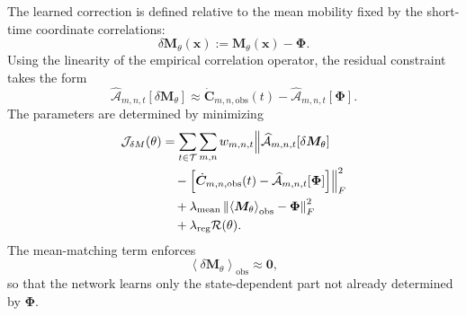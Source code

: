 \documentclass[11pt,twoside,fleqn]{article}
\begin{document}
The learned correction is defined relative to the mean mobility fixed by the short-time coordinate correlations:
\begin{equation}
    \delta\bm{M}_\theta(\bm{x})
    :=
    \bm{M}_\theta(\bm{x})
    -
    \bm{\Phi}.
    \label{eq:deltaM_theta_definition}
\end{equation}
Using the linearity of the empirical correlation operator, the residual constraint takes the form
\begin{equation}
    \widehat{\mathcal{A}}_{m,n,t}
    [\delta\bm{M}_\theta]
    \approx
    \dot{\bm{C}}_{m,n,\mathrm{obs}}(t)
    -
    \widehat{\mathcal{A}}_{m,n,t}[\bm{\Phi}].
    \label{eq:deltaM_residual_constraint}
\end{equation}
The parameters are determined by minimizing
\begin{equation}
\begin{aligned}
    \mathcal{J}_{\delta M}(\theta)
    &=
    \sum_{t\in\mathcal{T}}
    \sum_{m,n}
    w_{m,n,t}
    \Bigl\|
        \widehat{\mathcal{A}}_{m,n,t}[\delta\bm{M}_\theta]
    \Bigr.
    \\
    &\quad-\Bigl.
        \left[
            \dot{\bm{C}}_{m,n,\mathrm{obs}}(t)
            -
            \widehat{\mathcal{A}}_{m,n,t}[\bm{\Phi}]
        \right]
    \Bigr\|_F^2
    \\
    &\quad+
    \lambda_{\mathrm{mean}}
    \left\|
        \left\langle
            \bm{M}_\theta
        \right\rangle_{\mathrm{obs}}
        -
        \bm{\Phi}
    \right\|_F^2
    \\
    &\quad+
    \lambda_{\mathrm{reg}}\mathcal{R}(\theta).
\end{aligned}
\label{eq:deltaM_neural_loss}
\end{equation}
The mean-matching term enforces
\begin{equation}
    \left\langle
        \delta\bm{M}_\theta
    \right\rangle_{\mathrm{obs}}
    \approx
    \bm{0},
    \label{eq:deltaM_mean_constraint_neural}
\end{equation}
so that the network learns only the state-dependent part not already determined by
$\bm{\Phi}$.
\end{document}
